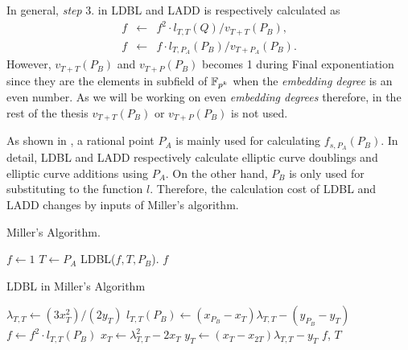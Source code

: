 In general, {\it step} 3. in LDBL and LADD is respectively calculated as  
\begin{eqnarray*}
	f &\leftarrow& f^2\cdot l_{T,T}(Q)/v_{T+T}(P_B),\\
	f &\leftarrow& f \cdot l_{T,P_A}(P_B)/v_{T+P_A}(P_B). 
\end{eqnarray*}
However, $v_{T+T}(P_B)$ and $v_{T+P}(P_B)$ becomes 1 during  Final exponentiation since they are the elements in  subfield of ${\mathbb{F}}_{p^{k}}$ when the {\it embedding degree} is an even number.
As we will be working on even {\it embedding degrees} therefore, in the rest of the thesis $v_{T+T}(P_B)$ or $v_{T+P}(P_B)$ is not used.

As shown in , a rational point $P_A$ is mainly used for calculating $f_{s,P_A}(P_B)$.
In detail, LDBL and LADD respectively calculate elliptic curve doublings and elliptic curve additions using $P_A$.
On the other hand, $P_B$ is only used for substituting to the function $l$.
Therefore, the calculation cost of LDBL and LADD changes by inputs of Miller's algorithm.

\begin{algorithm}[ht]
	\caption{Miller's Algorithm.}
	\label{alg:MillerAlg}
	\DontPrintSemicolon
	$f\leftarrow 1$ \;
	$T\leftarrow P_A$\;
	 {
		LDBL($f, T, P_B$). \;
		 }
	  $f$\;
\end{algorithm}


\begin{algorithm}[ht]
	\caption{LDBL in Miller's Algorithm}
	\label{algoLDBL}
	\DontPrintSemicolon
	$\lambda _{T,T} \leftarrow (3x_{T}^2)/(2y_{T})$ \;
	$l_{T,T}(P_B) \leftarrow (x_{P_B}-x_{T})\lambda _{T,T}- (y_{P_B}-y_{T})$\;
	$f\leftarrow f^2\cdot l_{T,T}(P_B)$ \;
	$x_{T} \leftarrow \lambda _{T,T}^2-2x_{T}$\;
	$y_{T} \leftarrow (x_{T}-x_{2T})\lambda _{T,T}-y_{T}$\;
	  $f$, $T$
\end{algorithm}

